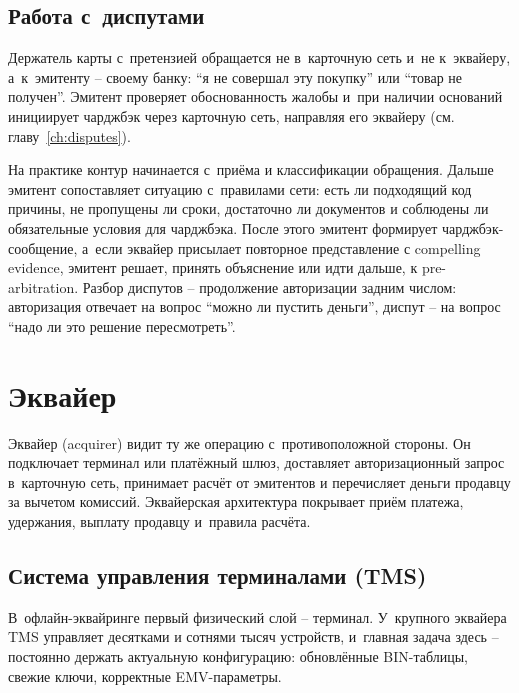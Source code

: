 \subsection*{Работа с~диспутами}

Держатель карты с~претензией обращается не в~карточную сеть и~не
к~эквайеру, а~к~эмитенту -- своему банку: \enquote{я не совершал
эту покупку} или \enquote{товар не получен}. Эмитент проверяет
обоснованность жалобы и~при наличии оснований инициирует чарджбэк
через карточную сеть, направляя его эквайеру
(см. главу~\ref{ch:disputes}).~\cite{visa-core-rules,mc-chargeback-guide,visa-vcr-merchants}

На практике контур начинается с~приёма и классификации обращения.
Дальше эмитент сопоставляет ситуацию с~правилами сети: есть ли
подходящий код причины, не пропущены ли сроки, достаточно ли
документов и соблюдены ли обязательные условия для чарджбэка.
После этого эмитент формирует чарджбэк-сообщение, а~если эквайер
присылает повторное представление с compelling evidence, эмитент
решает, принять объяснение или идти дальше, к pre-arbitration.
Разбор диспутов -- продолжение авторизации задним числом:
авторизация отвечает на вопрос \enquote{можно ли пустить деньги},
диспут -- на вопрос \enquote{надо ли это решение
пересмотреть}.~\cite{visa-core-rules,mc-chargeback-guide,visa-vcr-merchants}

\section{Эквайер}\label{sec:ia-acquirer}

Эквайер (acquirer) видит ту же операцию с~противоположной стороны.
Он подключает терминал или платёжный шлюз, доставляет авторизационный
запрос в~карточную сеть, принимает расчёт от эмитентов и перечисляет
деньги продавцу за вычетом комиссий. Эквайерская архитектура покрывает
приём платежа, удержания, выплату продавцу и~правила расчёта.

\subsection*{Система управления терминалами (TMS)}


В~офлайн-эквайринге первый физический слой -- терминал. У~крупного
эквайера TMS управляет десятками и сотнями тысяч устройств, и~главная
задача здесь -- постоянно держать актуальную конфигурацию: обновлённые
BIN-таблицы, свежие ключи, корректные EMV-параметры.

